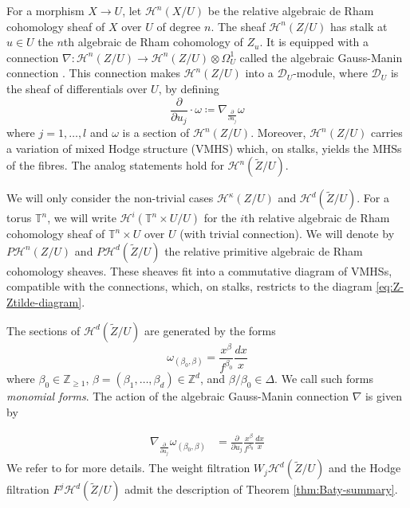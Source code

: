 \documentclass[11pt, reqno]{amsart}
\theoremstyle{plain}
\theoremstyle{definition}
\newcommand{\Z}{\mathbb{Z}}
\newcommand{\TT}{\mathbb{T}}
\begin{document}
For a morphism $X \to U$, let \( \mathcal{H}^n(X/U) \) be the relative algebraic de Rham cohomology sheaf of $X$ over $U$ of degree $n$. 
The sheaf $\mathcal{H}^{n}({Z}/U)$ has stalk at $u \in U$ the $n$th algebraic de Rham cohomology of $Z_u$. 
It is equipped with a connection $\nabla: \mathcal{H}^n({Z}/U)\to  \mathcal{H}^n({Z}/U) \otimes \Omega^1_U$ called the algebraic Gauss-Manin  connection \cite{Katz-Oda}. This connection makes $\mathcal{H}^n({Z}/U)$ into a $\mathcal{D}_U$-module, where $\mathcal{D}_U$ 
is the sheaf of differentials over $U$,  by defining 
\[ \frac{\partial}{\partial u_j} \cdot \omega\coloneqq \nabla_{\frac{\partial}{\partial u_j}} \omega
\]
where $j=1, \dots, l$ and $\omega$ is a section of $\mathcal{H}^n({Z}/U)$.
Moreover, $\mathcal{H}^n({Z}/U)$ carries a variation of mixed Hodge structure (VMHS) which, on stalks, yields the MHSs of the fibres. 
The analog statements hold for $\mathcal{H}^{n}(\widetilde{Z}/U)$. 

We will only consider the non-trivial cases $\mathcal{H}^{\kappa}({Z}/U)$ and $ \mathcal{H}^{d}(\widetilde{Z}/U)$.
For a torus $\TT^n$, we will write $\mathcal{H}^i(\TT^n \times U/U)$ for the $i$th relative algebraic de Rham cohomology sheaf of $\TT^n \times U$ over $U$ (with trivial connection). We will denote by $P\mathcal{H}^n({Z}/U)$ and $P\mathcal{H}^{d}(\widetilde{Z}/U)$ the relative primitive algebraic de Rham cohomology
sheaves. These sheaves fit into a commutative diagram of VMHSs, compatible with the connections, which, on stalks, restricts to the diagram \eqref{eq:Z-Ztilde-diagram}. 


The sections of $\mathcal{H}^d(\widetilde{Z}/U)$ are generated by the forms 
\begin{equation}
\label{eq:form-omegab}
\omega_{(\beta_0,\beta)}= \frac{x^{\beta}}{f^{\beta_0}} \frac{dx}{x}
\end{equation}
where $\beta_0 \in \Z_{\ge 1}$, $\beta=(\beta_1,\dots,\beta_d) \in \Z^d$,  and $\beta/\beta_0 \in \Delta$. We call such forms \emph{monomial forms}.
The action of the algebraic Gauss-Manin connection $\nabla$ 
is given by

\begin{align}
\label{eq:construction-of-gauss-manin}
\nabla_{\frac{\partial}{\partial u_j}}\omega_{(\beta_0,\beta)} 
   & =  \frac{\partial}{\partial u_j} \frac{x^{\beta}}{f^{\beta_0}} \frac{dx}{x}  
\end{align} 
We refer to \cite[Section 11]{Batyrev-tori} for more details. 
The weight filtration $W_j\mathcal{H}^d(\widetilde{Z}/U)$ and the Hodge filtration $F^j\mathcal{H}^d(\widetilde{Z}/U)$ admit the description of Theorem 
\ref{thm:Baty-summary}. 
\end{document}
